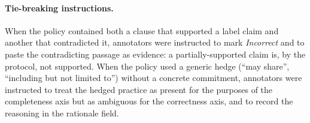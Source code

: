 \documentclass[11pt,a4paper]{article}
\begin{document}
\paragraph{Tie-breaking instructions.}
When the policy contained both a clause that supported a label claim
and another that contradicted it, annotators were instructed to mark
\emph{Incorrect} and to paste the contradicting passage as evidence:
a partially-supported claim is, by the protocol, not supported.
When the policy used a generic hedge (``may share'', ``including but
not limited to'') without a concrete commitment, annotators were
instructed to treat the hedged practice as present for the purposes of
the completeness axis but as ambiguous for the correctness axis, and
to record the reasoning in the rationale field.
\end{document}
